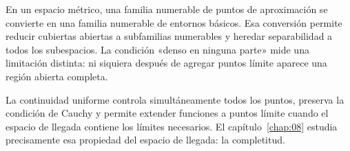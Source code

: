 En un espacio métrico, una familia numerable de puntos de aproximación se convierte en una familia numerable de entornos básicos. Esa conversión permite reducir cubiertas abiertas a subfamilias numerables y heredar separabilidad a todos los subespacios. La condición «denso en ninguna parte» mide una limitación distinta: ni siquiera después de agregar puntos límite aparece una región abierta completa.

La continuidad uniforme controla simultáneamente todos los puntos, preserva la condición de Cauchy y permite extender funciones a puntos límite cuando el espacio de llegada contiene los límites necesarios. El capítulo~\ref{chap:08} estudia precisamente esa propiedad del espacio de llegada: la completitud.
